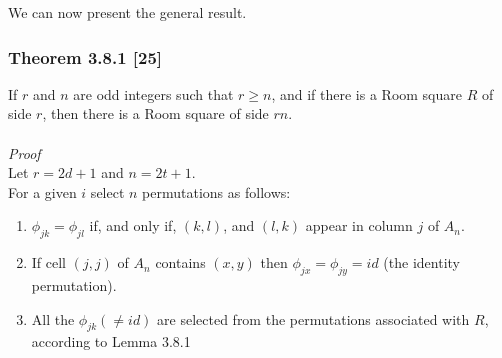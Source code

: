 \documentclass[
  12pt,
  a4paper]{book}
\begin{document}
We can now present the general result.

\hypertarget{theorem-3.8.1-25}{%
\subsubsection{Theorem 3.8.1 {[}25{]}}\label{theorem-3.8.1-25}}

If \(r\) and \(n\) are odd integers such that \(r \geq n\), and if there is a
Room square \(R\) of side \(r\), then there is a Room square of side \(rn\).\\
~\\
\emph{Proof}\\
Let \(r=2d+1\) and \(n=2t+1\).\\
For a given \(i\) select \(n\) permutations as follows:

\begin{enumerate}
\def\labelenumi{\arabic{enumi}.}
\item
  \(\phi _{jk} = \phi _{jl}\) if, and only if, \((k,l)\), and \((l,k)\)
  appear in column \(j\) of \(A_n\).
\item
  If cell \((j,j)\) of \(A_n\) contains \((x,y)\) then
  \(\phi _{jx}=\phi _{jy}=id\) (the identity permutation).
\item
  All the \(\phi _{jk} (\neq id)\) are selected from the permutations
  associated with \(R\), according to Lemma 3.8.1
\end{enumerate}
\end{document}
